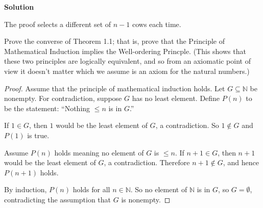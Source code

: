 \textbf{Solution}

The proof selects a different set of $n - 1$ cows each time.

\begin{tcolorbox}[title=Problem 16, breakable]
    Prove the converse of Theorem 1.1; that is, prove that the Principle 
    of Mathematical Induction implies the Well-ordering Princple. 
    (This shows that these two principles are logically equivalent,
    and so from an axiomatic point of view it doesn't matter which
    we assume is an axiom for the natural numbers.)
\end{tcolorbox}

\begin{proof}
    Assume that the principle of mathematical induction holds.
    Let $G \subseteq \mathbb{N}$ be nonempty. For contradiction, suppose $G$ has no least element. 
    Define $P(n)$ to be the statement: ``Nothing $\le n$ is in $G$.''

    If $1 \in G$, then $1$ would be the least element of $G$, a contradiction. So
    $1 \notin G$ and $P(1)$ is true.

    Assume $P(n)$ holds meaning no element of $G$ is $\le n$. If $n+1 \in G$, then
    $n+1$ would be the least element of $G$, a contradiction. Therefore $n+1 \notin
        G$, and hence $P(n+1)$ holds.

    By induction, $P(n)$ holds for all $n \in \mathbb{N}$. So no element of
    $\mathbb{N}$ is in $G$, so $G = \emptyset$, contradicting the assumption that
    $G$ is nonempty. 
\end{proof}